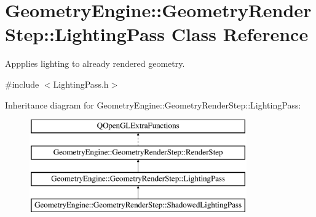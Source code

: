 \hypertarget{class_geometry_engine_1_1_geometry_render_step_1_1_lighting_pass}{}\section{Geometry\+Engine\+::Geometry\+Render\+Step\+::Lighting\+Pass Class Reference}
\label{class_geometry_engine_1_1_geometry_render_step_1_1_lighting_pass}


Appplies lighting to already rendered geometry.  




{\ttfamily \#include $<$Lighting\+Pass.\+h$>$}

Inheritance diagram for Geometry\+Engine\+::Geometry\+Render\+Step\+::Lighting\+Pass\+:\begin{figure}[H]
\begin{center}
\leavevmode
\includegraphics[height=4.000000cm]{class_geometry_engine_1_1_geometry_render_step_1_1_lighting_pass}
\end{center}
\end{figure}

